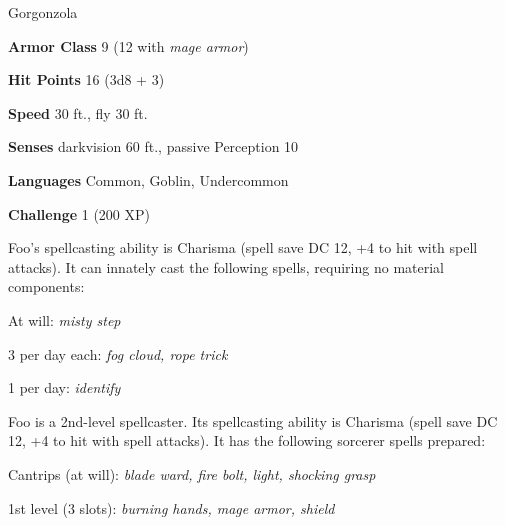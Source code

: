 \documentclass[letterpaper,twocolumn,openany,hidelinks]{memoir}
\begin{document}
\begin{RPGStatBlock}[float*=b,width=\textwidth + 8pt]{Gorgonzola}
	\begin{multicols}{2}

		\begin{RPGStatBlockDetails}
			\item \textbf{Armor Class} 9 (12 with \emph{mage armor})
			\item \textbf{Hit Points} 16 (3d8 + 3)
			\item \textbf{Speed} 30 ft., fly 30 ft.
		\end{RPGStatBlockDetails}
		

		\begin{RPGStatBlockDetails}
			\item \textbf{Senses} darkvision 60 ft., passive Perception 10
			\item \textbf{Languages} Common, Goblin, Undercommon
			\item \textbf{Challenge} 1 (200 XP)
		\end{RPGStatBlockDetails}

    	Foo's spellcasting ability is Charisma (spell save DC 12, +4 to hit with spell attacks).
		It can innately cast the following spells, requiring no material components:

		\begin{RPGStatBlockSpell}
			\item At will: \textit{misty step}
			\item 3 per day each: \textit{fog cloud, rope trick}
			\item 1 per day: \textit{identify}
		\end{RPGStatBlockSpell}

		Foo is a 2nd-level spellcaster. Its spellcasting ability is Charisma (spell save DC 12, +4 to hit with spell attacks). It has the following sorcerer spells prepared:
		
		\begin{RPGStatBlockSpell}
			\setlength{\leftmargin}{0pt}
			\item Cantrips (at will): \textit{blade ward, fire bolt, light, shocking grasp}
			\item 1st level (3 slots): \textit{burning hands, mage armor, shield}
		\end{RPGStatBlockSpell}


\end{multicols}
\end{RPGStatBlock}
\end{document}
